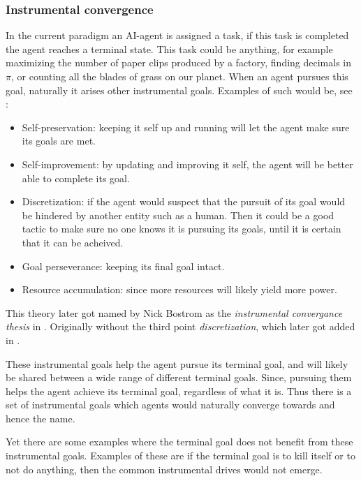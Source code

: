 \documentclass[12pt,A4]{report}
\theoremstyle{definition}
\begin{document}

\subsubsection{Instrumental convergence}
In the current paradigm an AI-agent is assigned a task, if this task is completed the agent reaches a terminal state. This task could be anything, for example maximizing the number of paper clips produced by a factory, finding decimals in $\pi$, or counting all the blades of grass on our planet. When an agent pursues this goal, naturally it arises other instrumental goals. Examples of such would be, see \citet{Omohundro08}:
\begin{itemize}
    \item Self-preservation: keeping it self up and running will let the agent make sure its goals are met.
    \item Self-improvement: by updating and improving it self, the agent will be better able to complete its goal.
    \item Discretization: if the agent would suspect that the pursuit of its goal would be hindered by another entity such as a human. Then it could be a good tactic to make sure no one knows it is pursuing its goals, until it is certain that it can be acheived.
    \item Goal perseverance: keeping its final goal intact.
    \item Resource accumulation: since more resources will likely yield more power.
\end{itemize}
This theory later got named by Nick Bostrom as the \textit{instrumental convergance thesis} in \citet{Bostrom12}. Originally without the third point \textit{discretization}, which later got added in \citet{Bostrom14}.

These instrumental goals help the agent pursue its terminal goal, and will likely be shared between a wide range of different terminal goals. Since, pursuing them helps the agent achieve its terminal goal, regardless of what it is. Thus there is a set of instrumental goals which agents would naturally converge towards and hence the name. 

Yet there are some examples where the terminal goal does not benefit from these instrumental goals. Examples of these are if the terminal goal is to kill itself or to not do anything, then the common instrumental drives would not emerge. 
\end{document}
